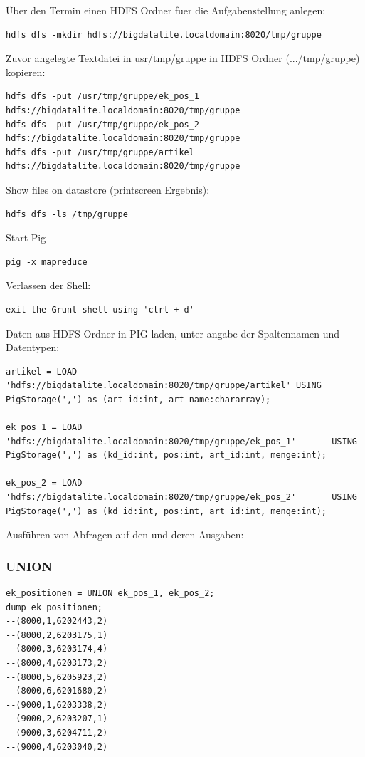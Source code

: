 Über den Termin einen HDFS Ordner fuer die Aufgabenstellung anlegen:
\begin{lstlisting}
hdfs dfs -mkdir hdfs://bigdatalite.localdomain:8020/tmp/gruppe
\end{lstlisting}

Zuvor angelegte Textdatei in usr/tmp/gruppe in HDFS Ordner (.../tmp/gruppe) kopieren:
\begin{lstlisting}
hdfs dfs -put /usr/tmp/gruppe/ek_pos_1 hdfs://bigdatalite.localdomain:8020/tmp/gruppe
hdfs dfs -put /usr/tmp/gruppe/ek_pos_2 hdfs://bigdatalite.localdomain:8020/tmp/gruppe
hdfs dfs -put /usr/tmp/gruppe/artikel hdfs://bigdatalite.localdomain:8020/tmp/gruppe
\end{lstlisting}

Show files on datastore (printscreen Ergebnis):
\begin{lstlisting}
hdfs dfs -ls /tmp/gruppe
\end{lstlisting}

Start Pig
\begin{lstlisting}
pig -x mapreduce
\end{lstlisting}

Verlassen der Shell: 
\begin{lstlisting}
exit the Grunt shell using 'ctrl + d'
\end{lstlisting}


Daten aus HDFS Ordner in PIG laden, unter angabe der Spaltennamen und Datentypen:
\begin{lstlisting}
artikel = LOAD 'hdfs://bigdatalite.localdomain:8020/tmp/gruppe/artikel' USING
PigStorage(',') as (art_id:int, art_name:chararray);

ek_pos_1 = LOAD 'hdfs://bigdatalite.localdomain:8020/tmp/gruppe/ek_pos_1'       USING    PigStorage(',') as (kd_id:int, pos:int, art_id:int, menge:int);

ek_pos_2 = LOAD 'hdfs://bigdatalite.localdomain:8020/tmp/gruppe/ek_pos_2'       USING PigStorage(',') as (kd_id:int, pos:int, art_id:int, menge:int);
\end{lstlisting}

Ausführen von Abfragen auf den und deren Ausgaben:

\subsubsection*{UNION}
\begin{lstlisting}
ek_positionen = UNION ek_pos_1, ek_pos_2;
dump ek_positionen;
--(8000,1,6202443,2)
--(8000,2,6203175,1)
--(8000,3,6203174,4)
--(8000,4,6203173,2)
--(8000,5,6205923,2)
--(8000,6,6201680,2)
--(9000,1,6203338,2)
--(9000,2,6203207,1)
--(9000,3,6204711,2)
--(9000,4,6203040,2)
\end{lstlisting}

